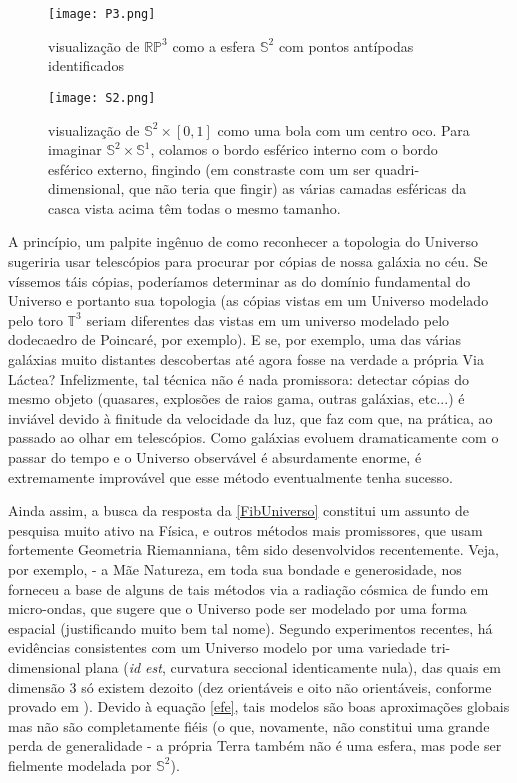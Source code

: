 \begin{figure}[H]
\centering
\texttt{[image: P3.png]}
\caption{visualização de $\mathbb{R}\mathbb{P}^3$ como a esfera $\mathbb{S}^2$ com pontos antípodas identificados}
\end{figure}

\begin{figure}[H]
\centering
\texttt{[image: S2.png]}
\caption{visualização de $\mathbb{S}^2 \times [0, 1]$ como uma bola com um centro oco. Para imaginar $\mathbb{S}^2 \times \mathbb{S}^1$, colamos o bordo esférico interno com o bordo esférico externo, fingindo (em constraste com um ser quadri-dimensional, que não teria que fingir) as várias camadas esféricas da casca vista acima têm todas o mesmo tamanho.}
\end{figure}
\fi

A princípio, um palpite ingênuo de como reconhecer a topologia do Universo sugeriria usar telescópios para procurar por cópias de nossa galáxia no céu. Se víssemos táis cópias, poderíamos determinar as  do domínio fundamental do Universo e portanto sua topologia (as cópias vistas em um Universo modelado pelo toro $\mathbb{T}^3$ seriam diferentes das vistas em um universo modelado pelo dodecaedro de Poincaré, por exemplo). E se, por exemplo, uma das várias galáxias muito distantes descobertas até agora fosse na verdade a própria Via Láctea? Infelizmente, tal técnica não é nada promissora: detectar cópias do mesmo objeto (quasares, explosões de raios gama, outras galáxias, etc...) é inviável devido à finitude da velocidade da luz, que faz com que, na prática,  ao passado ao olhar em telescópios. Como galáxias evoluem dramaticamente com o passar do tempo e o Universo observável é absurdamente enorme, é extremamente improvável que esse método eventualmente tenha sucesso. \par 
Ainda assim, a busca da resposta da \cref{FibUniverso} constitui um assunto de pesquisa muito ativo na Física, e outros métodos mais promissores, que usam fortemente Geometria Riemanniana, têm sido desenvolvidos recentemente. Veja, por exemplo,  - a Mãe Natureza, em toda sua bondade e generosidade, nos forneceu a base de alguns de tais métodos via a radiação cósmica de fundo em micro-ondas, que sugere que o Universo pode ser modelado por uma forma espacial (justificando muito bem tal nome). Segundo experimentos recentes, há evidências consistentes com um Universo modelo por uma variedade tri-dimensional plana (\emph{id est}, curvatura seccional identicamente nula), das quais em dimensão $3$ só existem dezoito (dez orientáveis e oito não orientáveis, conforme provado em ). Devido à equação \cref{efe}, tais modelos são boas aproximações globais mas não são completamente fiéis (o que, novamente, não constitui uma grande perda de generalidade - a própria Terra também não é uma esfera, mas pode ser fielmente modelada por $\mathbb{S}^2$). 

